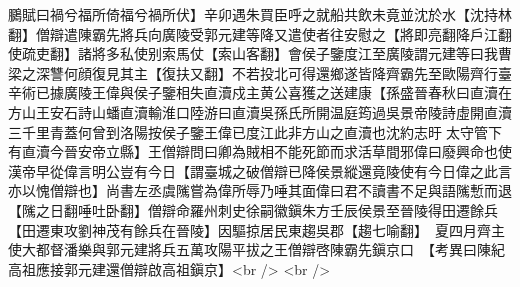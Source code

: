 鵩賦曰禍兮福所倚福兮禍所伏】辛卯遇朱買臣呼之就船共飲未竟並沈於水【沈持林翻】僧辯遣陳霸先將兵向廣陵受郭元建等降又遣使者往安慰之【將即亮翻降戶江翻使疏吏翻】諸將多私使别索馬仗【索山客翻】會侯子鑒度江至廣陵謂元建等曰我曹梁之深讐何顔復見其主【復扶又翻】不若投北可得還鄉遂皆降齊霸先至歐陽齊行臺辛術已據廣陵王偉與侯子鑒相失直瀆戍主黄公喜獲之送建康【孫盛晉春秋曰直瀆在方山王安石詩山蟠直瀆輸淮口陸游曰直瀆吳孫氏所開温庭筠過吳景帝陵詩虛開直瀆三千里青蓋何曾到洛陽按侯子鑒王偉已度江此非方山之直瀆也沈約志旴太守管下有直瀆今晉安帝立縣】王僧辯問曰卿為賊相不能死節而求活草間邪偉曰廢興命也使漢帝早從偉言明公豈有今日【謂臺城之破僧辯已降侯景縱還竟陵使有今日偉之此言亦以愧僧辯也】尚書左丞虞隲嘗為偉所辱乃唾其面偉曰君不讀書不足與語隲慙而退【隲之日翻唾吐卧翻】僧辯命羅州刺史徐嗣徽鎭朱方壬辰侯景至晉陵得田遷餘兵【田遷東攻劉神茂有餘兵在晉陵】因驅掠居民東趨吳郡【趨七喻翻】　夏四月齊主使大都督潘樂與郭元建將兵五萬攻陽平拔之王僧辯啓陳霸先鎭京口　【考異曰陳紀高祖應接郭元建還僧辯啟高祖鎭京】<br />
<br />

